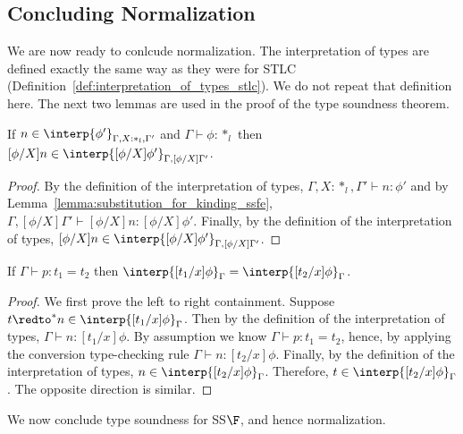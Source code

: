 \subsection{Concluding Normalization}
\label{subsec:concluding_normalization_ssfe}
We are now ready to conlcude normalization.  The interpretation of
types are defined exactly the same way as they were for STLC
(Definition~\ref{def:interpretation_of_types_stlc}).  We do not repeat
that definition here.  The next two lemmas are used in the proof of
the type soundness theorem.

\begin{corollary}
  If $n \in \interp{\phi'}_{\Gamma,X:*_l,\Gamma'}$ and 
  $\Gamma \vdash \phi:*_l$ then 
  $[\phi/X]n \in \interp{[\phi/X]\phi'}_{\Gamma,[\phi/X]\Gamma'}$.
  \label{lemma:type_sub_ssfe}
\end{corollary}
\begin{proof}
  By the definition of the interpretation of types, $\Gamma,X:*_l,\Gamma' \vdash n:\phi'$ and
  by Lemma~\ref{lemma:substitution_for_kinding_ssfe}, 
  $\Gamma,[\phi/X]\Gamma' \vdash [\phi/X]n:[\phi/X]\phi'$.  Finally,
  by the definition of the interpretation of types, 
  $[\phi/X]n \in \interp{[\phi/X]\phi'}_{\Gamma,[\phi/X]\Gamma'}$.
\end{proof}
\begin{lemma}
  \label{lemma:equality_of_interpretation_of_types_ssfe}
  If $\Gamma \vdash p:t_1 = t_2$ then $\interp{[t_1/x]\phi}_\Gamma = \interp{[t_2/x]\phi}_\Gamma$.
\end{lemma}
\begin{proof}
  We first prove the left to right containment.  Suppose $t \redto^* n
  \in \interp{[t_1/x]\phi}_\Gamma$. Then by the definition of the
  interpretation of types, $\Gamma \vdash n:[t_1/x]\phi$.  By assumption
  we know $\Gamma \vdash p:t_1 = t_2$, hence, by applying the conversion
  type-checking rule $\Gamma \vdash n:[t_2/x]\phi$.  Finally, by the
  definition of the interpretation of types, $n \in
  \interp{[t_2/x]\phi}_\Gamma$.  Therefore, $t \in
  \interp{[t_2/x]\phi}_\Gamma$.  The opposite direction is similar.
\end{proof}
\noindent
We now conclude type soundness for SS$\F$, and hence normalization.  

